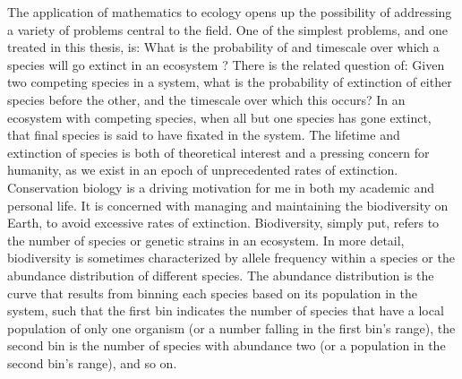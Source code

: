 The application of mathematics to ecology opens up the possibility of addressing a variety of problems central to the field. 
One of the simplest problems, and one treated in this thesis, is: What is the probability of and timescale over which a species will go extinct in an ecosystem \cite{Badali2019a,Badali2019b}? 
There is the related question of: Given two competing species in a system, what is the probability of extinction of either species before the other, and the timescale over which this occurs? 
In an ecosystem with competing species, when all but one species has gone extinct, that final species is said to have fixated in the system. 
The lifetime and extinction of species is both of theoretical interest and a pressing concern for humanity, as we exist in an epoch of unprecedented rates of extinction. 
Conservation biology is a driving motivation for me in both my academic and personal life. 
It is concerned with managing and maintaining the biodiversity on Earth, to avoid excessive rates of extinction. 
Biodiversity, simply put, refers to the number of species or genetic strains in an ecosystem. 
In more detail, biodiversity is sometimes characterized by allele frequency within a species or the abundance distribution of different species. %
The abundance distribution is the curve that results from binning each species based on its population in the system, such that the first bin indicates the number of species that have a local population of only one organism (or a number falling in the first bin's range), the second bin is the number of species with abundance two (or a population in the second bin's range), and so on. 

